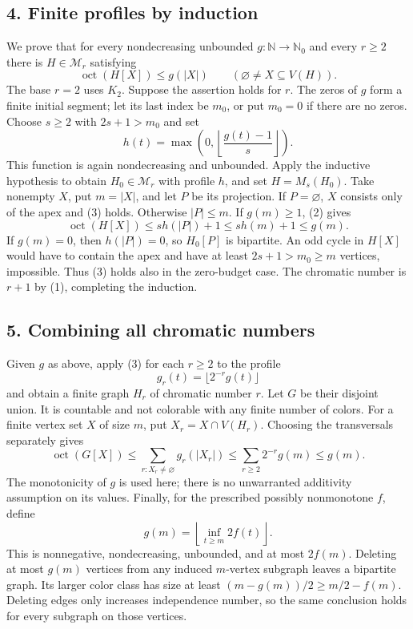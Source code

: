 \subsection*{4. Finite profiles by induction}
We prove that for every nondecreasing unbounded $g:\mathbb N\to\mathbb N_0$ and every $r\ge2$ there is $H\in\mathcal M_r$ satisfying
\[
 \operatorname{oct}(H[X])\le g(|X|)\qquad(\varnothing\ne X\subseteq V(H)). \tag{3}
\]
The base $r=2$ uses $K_2$. Suppose the assertion holds for $r$. The zeros of $g$ form a finite initial segment; let its last index be $m_0$, or put $m_0=0$ if there are no zeros. Choose $s\ge2$ with $2s+1>m_0$ and set
\[
 h(t)=\max\left(0,\left\lfloor\frac{g(t)-1}{s}\right\rfloor\right).
\]
This function is again nondecreasing and unbounded. Apply the inductive hypothesis to obtain $H_0\in\mathcal M_r$ with profile $h$, and set $H=M_s(H_0)$.
Take nonempty $X$, put $m=|X|$, and let $P$ be its projection. If $P=\varnothing$, $X$ consists only of the apex and (3) holds. Otherwise $|P|\le m$. If $g(m)\ge1$, (2) gives
\[
 \operatorname{oct}(H[X])\le s h(|P|)+1\le s h(m)+1\le g(m).
\]
If $g(m)=0$, then $h(|P|)=0$, so $H_0[P]$ is bipartite. An odd cycle in $H[X]$ would have to contain the apex and have at least $2s+1>m_0\ge m$ vertices, impossible. Thus (3) holds also in the zero-budget case. The chromatic number is $r+1$ by (1), completing the induction.
\subsection*{5. Combining all chromatic numbers}
Given $g$ as above, apply (3) for each $r\ge2$ to the profile
\[
 g_r(t)=\lfloor 2^{-r}g(t)\rfloor
\]
and obtain a finite graph $H_r$ of chromatic number $r$. Let $G$ be their disjoint union. It is countable and not colorable with any finite number of colors.
For a finite vertex set $X$ of size $m$, put $X_r=X\cap V(H_r)$. Choosing the transversals separately gives
\[
 \operatorname{oct}(G[X])
 \le\sum_{r:X_r\ne\varnothing}g_r(|X_r|)
 \le\sum_{r\ge2}2^{-r}g(m)\le g(m).
\]
The monotonicity of $g$ is used here; there is no unwarranted additivity assumption on its values.
Finally, for the prescribed possibly nonmonotone $f$, define
\[
 g(m)=\left\lfloor\inf_{t\ge m}2f(t)\right\rfloor.
\]
This is nonnegative, nondecreasing, unbounded, and at most $2f(m)$. Deleting at most $g(m)$ vertices from any induced $m$-vertex subgraph leaves a bipartite graph. Its larger color class has size at least $(m-g(m))/2\ge m/2-f(m)$. Deleting edges only increases independence number, so the same conclusion holds for every subgraph on those vertices.
